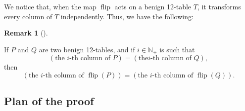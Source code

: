 \documentclass[numbers=enddot,12pt,final,onecolumn,notitlepage]{scrartcl}%
\theoremstyle{definition}
\newtheorem{remk}[theo]{Remark}
\newenvironment{remark}[1][]
{\begin{remk}[#1]\begin{leftbar}}
{\end{leftbar}\end{remk}}
\begin{document}
We notice that, when the map $\operatorname*{flip}$ acts on a benign 12-table
$T$, it transforms every column of $T$ independently. Thus, we have the following:

\begin{remark}
\label{rmk.flip.independent}If $P$ and $Q$ are two benign 12-tables, and if
$i\in\mathbb{N}_{+}$ is such that%
\[
\left(  \text{the }i\text{-th column of }P\right)  =\left(  \text{the
}i\text{-th column of }Q\right)  ,
\]
then%
\[
\left(  \text{the }i\text{-th column of }\operatorname*{flip}\left(  P\right)
\right)  =\left(  \text{the }i\text{-th column of }\operatorname*{flip}\left(
Q\right)  \right)  .
\]

\end{remark}

\subsection{Plan of the proof}
\end{document}
